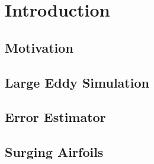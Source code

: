  
\chapter{Introduction}

\section{Motivation}

\label{sec:motivation}

\section{Large Eddy Simulation}

\label{sec:intro_les}

\section{Error Estimator}

\label{sec:intro_ee}

\section{Surging Airfoils}

\label{sec:surging}




